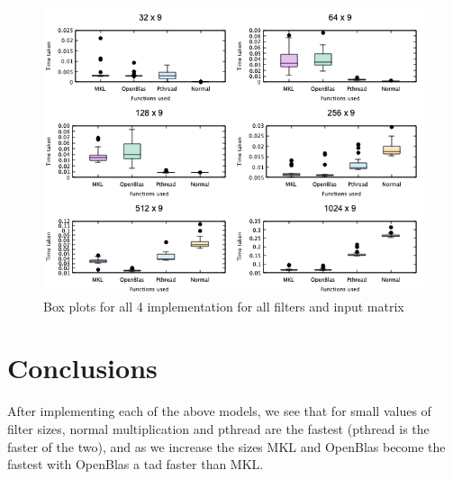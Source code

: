 \documentclass[a4paper]{article}
\begin{document}
\begin{figure}[!htbp]
\begin{center}
\includegraphics[width=12cm]{9filter.png}
\end{center}
\caption{Box plots for all 4 implementation for all filters and input matrix} \label{9filter}
\end{figure}

\section{Conclusions}

After implementing each of the above models, we see that for small values of filter sizes, normal multiplication and pthread are the fastest (pthread is the faster of the two), and as we increase the sizes MKL and OpenBlas become the fastest with OpenBlas a tad faster than MKL.





\end{document}
